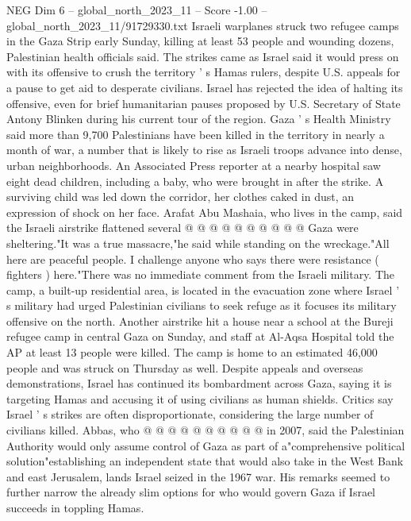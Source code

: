 \begin{textsample}{NEG Dim 6 – global\_north\_2023\_11 – Score -1.00 – global\_north\_2023\_11/91729330.txt}  \label{ex:f6_neg_197}
Israeli warplanes struck two refugee camps in the Gaza Strip early Sunday, killing at least 53 people and wounding dozens, Palestinian health officials said.
The strikes came as Israel said it would press on with its offensive to crush the territory ' s Hamas rulers, despite U.S. appeals for a pause to get aid to desperate civilians.
Israel has rejected the idea of halting its offensive, even for brief humanitarian pauses proposed by U.S.
Secretary of State Antony Blinken during his current tour of the region.
Gaza ' s Health Ministry said more than 9,700 Palestinians have been killed in the territory in nearly a month of war, a number that is likely to rise as Israeli troops advance into dense, urban neighborhoods.
An Associated Press reporter at a nearby hospital saw eight dead children, including a baby, who were brought in after the strike.
A surviving child was led down the corridor, her clothes caked in dust, an expression of shock on her face.
Arafat Abu Mashaia, who lives in the camp, said the Israeli airstrike flattened several @ @ @ @ @ @ @ @ @ @ Gaza were sheltering."It was a true massacre,"he said while standing on the wreckage."All here are peaceful people.
I challenge anyone who says there were resistance ( fighters ) here."There was no immediate comment from the Israeli military.
The camp, a built-up residential area, is located in the evacuation zone where Israel ' s military had urged Palestinian civilians to seek refuge as it focuses its military offensive on the north.
Another airstrike hit a house near a school at the Bureji refugee camp in central Gaza on Sunday, and staff at Al-Aqsa Hospital told the AP at least 13 people were killed.
The camp is home to an estimated 46,000 people and was struck on Thursday as well.
Despite appeals and overseas demonstrations, Israel has continued its bombardment across Gaza, saying it is targeting Hamas and accusing it of using civilians as human shields.
Critics say Israel ' s strikes are often disproportionate, considering the large number of civilians killed.
Abbas, who @ @ @ @ @ @ @ @ @ @ in 2007, said the Palestinian Authority would only assume control of Gaza as part of a"comprehensive political solution"establishing an independent state that would also take in the West Bank and east Jerusalem, lands Israel seized in the 1967 war.
His remarks seemed to further narrow the already slim options for who would govern Gaza if Israel succeeds in toppling Hamas.

\end{textsample}
